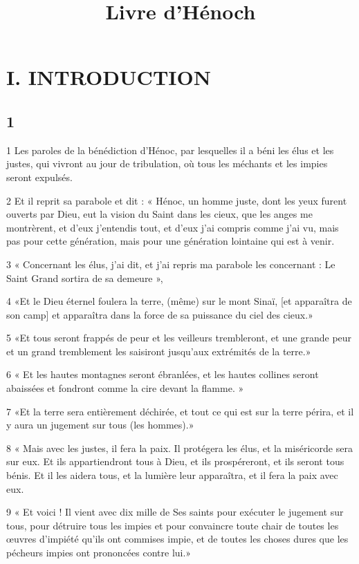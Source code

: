 

\title{Livre d'Hénoch}

\part{I. INTRODUCTION}

\chapter{1}

\par 1 Les paroles de la bénédiction d'Hénoc, par lesquelles il a béni les élus et les justes, qui vivront au jour de tribulation, où tous les méchants et les impies seront expulsés.
\par 2 Et il reprit sa parabole et dit : « Hénoc, un homme juste, dont les yeux furent ouverts par Dieu, eut la vision du Saint dans les cieux, que les anges me montrèrent, et d'eux j'entendis tout, et d'eux j'ai compris comme j'ai vu, mais pas pour cette génération, mais pour une génération lointaine qui est à venir.
\par 3 « Concernant les élus, j'ai dit, et j'ai repris ma parabole les concernant : Le Saint Grand sortira de sa demeure »,
\par 4 «Et le Dieu éternel foulera la terre, (même) sur le mont Sinaï, [et apparaîtra de son camp] et apparaîtra dans la force de sa puissance du ciel des cieux.»
\par 5 «Et tous seront frappés de peur et les veilleurs trembleront, et une grande peur et un grand tremblement les saisiront jusqu'aux extrémités de la terre.»
\par 6 « Et les hautes montagnes seront ébranlées, et les hautes collines seront abaissées et fondront comme la cire devant la flamme. »
\par 7 «Et la terre sera entièrement déchirée, et tout ce qui est sur la terre périra, et il y aura un jugement sur tous (les hommes).»
\par 8 « Mais avec les justes, il fera la paix. Il protégera les élus, et la miséricorde sera sur eux. Et ils appartiendront tous à Dieu, et ils prospéreront, et ils seront tous bénis. Et il les aidera tous, et la lumière leur apparaîtra, et il fera la paix avec eux.
\par 9 « Et voici ! Il vient avec dix mille de Ses saints pour exécuter le jugement sur tous, pour détruire tous les impies et pour convaincre toute chair de toutes les œuvres d'impiété qu'ils ont commises impie, et de toutes les choses dures que les pécheurs impies ont prononcées contre lui.»

